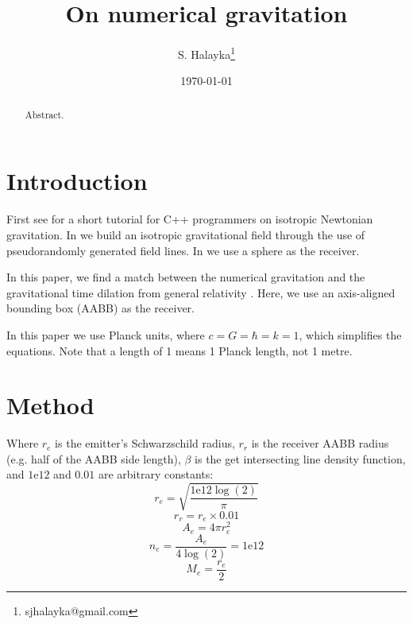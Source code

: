 \documentclass[12pt]{article}
\title{On numerical gravitation}
\author{S. Halayka\footnote{sjhalayka@gmail.com}}
\date{\today\;\currenttime}
\begin{document}
 
\maketitle

\begin{abstract}
Abstract.
\end{abstract}




\section{Introduction}

First see \cite{halayka} for a short tutorial for C++ programmers on isotropic Newtonian gravitation.
In \cite{halayka} we build an isotropic gravitational field through the use of pseudorandomly generated field lines.
In \cite{halayka} we use a sphere as the receiver.

In this paper, we find a match between the numerical gravitation and the gravitational time dilation from general relativity \cite{hooft, susskind, misner}.
Here, we use an axis-aligned bounding box (AABB) as the receiver.

In this paper we use Planck units, where $c = G = \hbar = k = 1$, which simplifies the equations.
Note that a length of 1 means 1 Planck length, not 1 metre.


\section{Method}

Where $r_{e}$ is the emitter's Schwarzschild radius, $r_{r}$ is the receiver AABB radius (e.g. half of the AABB side length), $\beta$ is the get intersecting line density function, and $1\mathrm{e}12$ and $0.01$ are arbitrary constants:
\begin{equation}
r_{e} = \sqrt{\frac{1\mathrm{e}12 \log(2)}{\pi}}
\end{equation}
\begin{equation}
r_{r} = r_{e} \times 0.01
\end{equation}
\begin{equation}
A_{e} = 4 \pi r_{e}^2
\end{equation}
\begin{equation}
n_{e} = \frac{A_{e}}{4 \log(2)} = 1\mathrm{e}12
\end{equation}
\begin{equation}
M_{e} = \frac{r_{e}}{2}
\end{equation}
\end{document}
